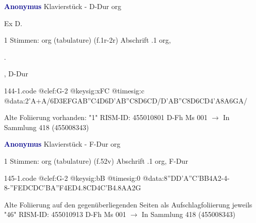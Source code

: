 \documentclass[twocolumn]{book}
\begin{document}
\newline \par \vspace{7pt} \textcolor{darkblue}{\textbf{Anonymus  }}
\newline Klavierstück - D-Dur
\newline org
\newline \begin{itshape}[f.1r, at left:] Ex D.\end{itshape} 
\newline \textcolor{darkblue}{}  1 Stimmen: org (tabulature)  (f.1r-2r)
\newline Abschrift
.1  org, \begin{itshape}.\end{itshape}, D-Dur  
\begin{filecontents*}{144-1.code}
@clef:G-2
@keysig:xFC
@timesig:c
@data:2'A+A/{6D3EF}{GAB''C}4D{6D'AB''C}{8D6CD}/{D'AB''C}{8D6CD}4'A{8A6GA}/
\end{filecontents*}
\newline
%
\newline Alte Foliierung vorhanden: "1"
\newline RISM-ID: 455010801
\newline D-Fh  Ms 001
\newline $\rightarrow$ In Sammlung 418 (455008343)
      
\newline \par \vspace{7pt} \textcolor{darkblue}{\textbf{Anonymus  }}
\newline Klavierstück - F-Dur
\newline org
\newline \begin{itshape}\end{itshape} 
\newline \textcolor{darkblue}{}  1 Stimmen: org (tabulature)  (f.52v)
\newline Abschrift
.1  org, F-Dur  
\begin{filecontents*}{145-1.code}
@clef:G-2
@keysig:bB
@timesig:0
@data:{8''DD'A''C}{'BB}4A2-4-8-''F{EDCD}{C'BA''F}4ED4.8CD4C'B4.8AA2G
\end{filecontents*}
\newline
%
\newline Alte Foliierung auf den gegenüberliegenden Seiten als Aufschlagfoliierung jeweils "46"
\newline RISM-ID: 455010913
\newline D-Fh  Ms 001
\newline $\rightarrow$ In Sammlung 418 (455008343)
      
\end{document}
